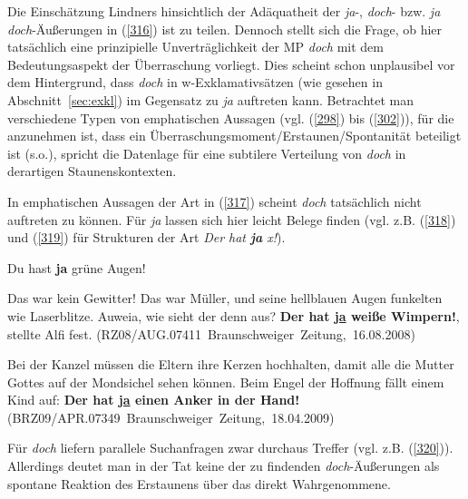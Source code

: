 Die Einschätzung Lindners hinsichtlich der Adäquatheit der \textit{ja}-, \textit{doch}- bzw. \textit{ja doch}-Äußerungen in (\ref{316}) ist zu teilen. Dennoch stellt sich die Frage, ob hier tatsächlich eine prinzipielle Unverträglichkeit der MP \textit{doch} mit dem Bedeutungsaspekt der Überraschung vorliegt. Dies scheint schon unplausibel vor dem Hintergrund, dass \textit{doch} in w-Exklamativsätzen (wie gesehen in Abschnitt~\ref{sec:exkl}) im Gegensatz zu \textit{ja} auftreten kann. Betrachtet man verschiedene Typen von emphatischen Aussagen (vgl. (\ref{298}) bis (\ref{302})), für die anzunehmen ist, dass ein Überraschungsmoment/Erstaunen/Spontanität beteiligt ist (s.o.), spricht die Datenlage für eine subtilere Verteilung von \textit{doch} in derartigen \glq Staunens\grq {}kontexten.  

In emphatischen Aussagen der Art in (\ref{317}) scheint \textit{doch} tatsächlich nicht auftre\-ten zu können. Für \textit{ja} lassen sich hier leicht Belege finden (vgl. z.B. (\ref{318}) und (\ref{319}) für Strukturen der Art \textit{Der hat \textbf{ja} x!}). 

\begin{exe}
	\ex\label{317}
	Du hast \textbf{ja} grüne Augen! 
	\hfill\hbox {\citet[108]{Thurmair1989}}
\end{exe}

\begin{exe}
	\ex\label{318}
	\scriptsize 
	Das war kein Gewitter! Das war Müller, und seine hellblauen Augen funkelten wie Laserblitze.
	\glqq Auweia, wie sieht der denn aus? \textbf{Der hat \underline{ja} weiße Wimpern!}\grqq{}, stellte Alfi fest.
	\newline
	\hbox{}\hfill\hbox{(RZ08/AUG.07411 Braunschweiger Zeitung, 16.08.2008)}	
\end{exe}

\begin{exe}
	\ex\label{319}
	\scriptsize 
	Bei der Kanzel müssen die Eltern ihre Kerzen hochhalten, damit alle die Mutter Gottes auf der Mondsichel sehen können. Beim Engel der Hoffnung fällt 		einem Kind auf: \glqq \textbf{Der hat \underline{ja} einen Anker in der Hand!}\grqq{}      
	\hfill\hbox{(BRZ09/APR.07349 Braunschweiger Zeitung, 18.04.2009)}	
\end{exe}							                                      							      
Für \textit{doch} liefern parallele Suchanfragen zwar durchaus Treffer (vgl. z.B. (\ref{320})). Allerdings deutet man in der Tat keine der zu findenden \textit{doch}-Äußerungen als spontane Reaktion des Erstaunens über das direkt Wahrgenommene.

